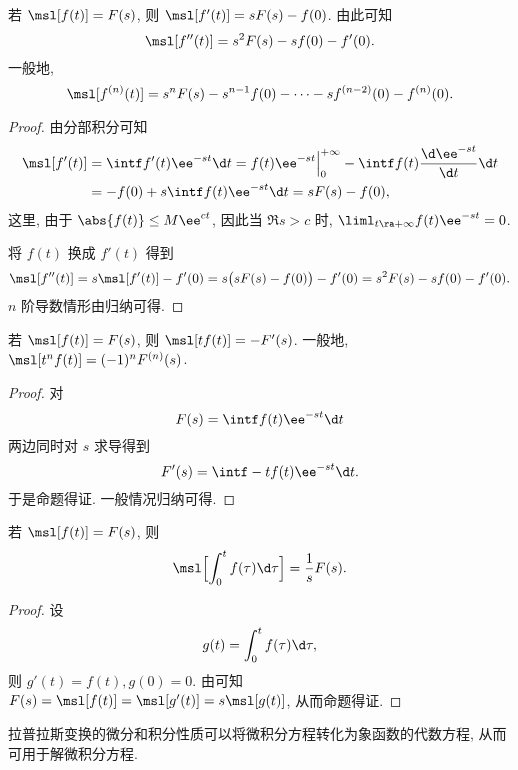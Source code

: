 \begin{theorem}[微分性质]
  \label{thm:laplace-differential-property}
  若 $\msl[f(t)]=F(s)$, 则 $\msl[f'(t)]=sF(s)-f(0)$.
  由此可知
  \[
    \msl[f''(t)]=s^2F(s)-sf(0)-f'(0).
  \]
  一般地,
  \[
    \msl[f^{(n)}(t)]=s^nF(s)-s^{n-1}f(0)-\cdots-sf^{(n-2)}(0)-f^{(n)}(0).
  \]
\end{theorem}

\begin{proof}
  由分部积分可知
  \begin{align*}
     \msl[f'(t)]
    &=\intf f'(t)\ee^{-st}\d t
    =f(t)\ee^{-st}\Big|_0^{+\infty}-\intf f(t)\frac{\d \ee^{-st}}{\d t}\d t\\
    &=-f(0)+s\intf f(t)\ee^{-st}\d t
    =sF(s)-f(0),
  \end{align*}
  这里, 由于 $\abs{f(t)}\le M\ee^{ct}$, 因此当 $\Re s>c$ 时, $\liml_{t\ra+\infty} f(t)\ee^{-st}=0$.
  
  将 $f(t)$ 换成 $f'(t)$ 得到
  \[
    \msl[f''(t)]=s\msl[f'(t)]-f'(0)
    =s\bigl(sF(s)-f(0)\bigr)-f'(0)
    =s^2F(s)-sf(0)-f'(0).
  \]
  $n$ 阶导数情形由归纳可得.
\end{proof}

\begin{theorem}[乘多项式性质]
  \label{thm:laplace-multiply-polynomial-property}
  若 $\msl[f(t)]=F(s)$, 则 $\msl[tf(t)]=-F'(s)$.
  一般地, $\msl[t^nf(t)]=(-1)^n F^{(n)}(s)$.
\end{theorem}

\begin{proof}
  对
  \[
    F(s)=\intf f(t)\ee^{-st}\d t
  \]
  两边同时对 $s$ 求导得到
  \[
    F'(s)=\intf -tf(t)\ee^{-st}\d t.
  \]
  于是命题得证. 一般情况归纳可得.
\end{proof}

\begin{theorem}[积分性质]
  \label{thm:laplace-integral-property}
  若 $\msl[f(t)]=F(s)$, 则
  \[
    \msl\Bigl[\int_0^t f(\tau)\d\tau\Bigr]
    =\frac1{s}F(s).
  \]
\end{theorem}

\begin{proof}
  设
  \[
    g(t)=\int_0^t f(\tau)\d \tau,
  \]
  则 $g'(t)=f(t), g(0)=0$.
  由\thmLDif 可知 $F(s)=\msl[f(t)]=\msl[g'(t)]=s\msl[g(t)]$, 从而命题得证.
\end{proof}

拉普拉斯变换的微分和积分性质可以将微积分方程转化为象函数的代数方程, 从而可用于解微积分方程.

